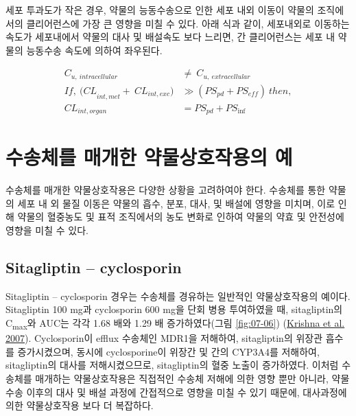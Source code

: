 \documentclass[
  11pt,
  krantz2, a4paper, twoside]{krantz}
\begin{document}
세포 투과도가 작은 경우, 약물의 능동수송으로 인한 세포 내외 이동이
약물의 조직에서의 클리어런스에 가장 큰 영향을 미칠 수 있다. 아래 식과
같이, 세포내외로 이동하는 속도가 세포내에서 약물의 대사 및 배설속도 보다
느리면, 간 클리어런스는 세포 내 약물의 능동수송 속도에 의하여 좌우된다.

\begin{equation}
\begin{split}
C_{u,\ intracellular} &\neq \ C_{u,\ extracellular} \\
{If,\ (CL}_{int,met} + \ {CL}_{int,exc}) &\gg \left( {PS}_{pd} + {PS}_{eff} \right)\ then, \\
{CL}_{int,organ} &= {PS}_{pd} + {PS}_{\inf}
\end{split}
\label{eq:eq07-02} 
\end{equation}

\hypertarget{uxc218uxc1a1uxccb4uxb97c-uxb9e4uxac1cuxd55c-uxc57duxbb3cuxc0c1uxd638uxc791uxc6a9uxc758-uxc608}{%
\section{수송체를 매개한 약물상호작용의 예}\label{uxc218uxc1a1uxccb4uxb97c-uxb9e4uxac1cuxd55c-uxc57duxbb3cuxc0c1uxd638uxc791uxc6a9uxc758-uxc608}}

수송체를 매개한 약물상호작용은 다양한 상황을 고려하여야 한다. 수송체를
통한 약물의 세포 내 외 물질 이동은 약물의 흡수, 분포, 대사, 및 배설에
영향을 미치며, 이로 인해 약물의 혈중농도 및 표적 조직에서의 농도 변화로
인하여 약물의 약효 및 안전성에 영향을 미칠 수 있다.

\hypertarget{sitagliptin-cyclosporin}{%
\subsection{Sitagliptin -- cyclosporin}\label{sitagliptin-cyclosporin}}

Sitagliptin -- cyclosporin 경우는 수송체를 경유하는 일반적인
약물상호작용의 예이다. Sitagliptin 100 mg과 cyclosporin 600 mg을 단회
병용 투여하였을 때, sitagliptin의 C\textsubscript{max}와 AUC는 각각 1.68 배와 1.29 배
증가하였다(그림 \ref{fig:07-06}) (\protect\hyperlink{ref-krishna2007effect}{Krishna et al. 2007}). Cyclosporin이
efflux 수송체인 MDR1을 저해하여, sitagliptin의 위장관 흡수를
증가시켰으며, 동시에 cyclosporine이 위장간 및 간의 CYP3A4를 저해하여,
sitagliptin의 대사를 저해시켰으므로, sitagliptin의 혈중 노출이
증가하였다. 이처럼 수송체를 매개하는 약물상호작용은 직접적인 수송체
저해에 의한 영향 뿐만 아니라, 약물 수송 이후의 대사 및 배설 과정에
간접적으로 영향을 미칠 수 있기 때문에, 대사과정에 의한 약물상호작용 보다
더 복잡하다.
\end{document}
